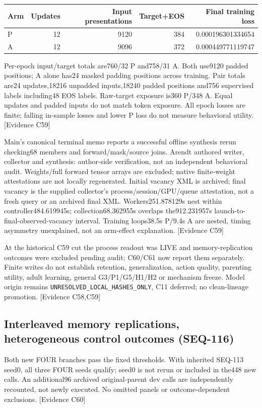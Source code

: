 \documentclass[11pt]{article}
\newcommand{\ev}[1]{\textsf{[Evidence #1]}}
\begin{document}
\begin{center}
\begin{tabular}{lrrrr}
\toprule
Arm & Updates & Input presentations & Target+EOS & Final training loss \\
\midrule
P & 12 & 9120 & 384 & 0.000196301334654 \\
A & 12 & 9096 & 372 & 0.000449771119747 \\
\bottomrule
\end{tabular}
\end{center}

Per-epoch input/target totals are760/32 P and758/31 A. Both use9120 padded
positions; A alone has24 masked padding positions across training. Pair totals
are24 updates,18216 unpadded inputs,18240 padded positions and756 supervised
labels including48 EOS labels. Raw-target exposure is360 P/348 A. Equal updates
and padded inputs do not match token exposure. All epoch losses are finite;
falling in-sample losses and lower P loss do not measure behavioral utility.
\ev{C59}

Main's canonical terminal memo reports a successful offline synthesis rerun
checking68 members and forward/mask/source joins. Arendt authored writer,
collector and synthesis: author-side verification, not an independent behavioral
audit. Weights/full forward tensor arrays are excluded; native finite-weight
attestations are not locally regenerated. Initial vacancy XML is archived;
final vacancy is the supplied collector's process/session/GPU/queue attestation,
not a fresh query or an archived final XML. Workers251.878129s nest within
controller484.619945s; collection68.362955s overlaps the912.231957s
launch-to-final-observed-vacancy interval. Training loops38.5s P/9.4s A are nested,
timing asymmetry unexplained, not an arm-effect explanation. \ev{C59}

At the historical C59 cut the process readout was LIVE and memory-replication
outcomes were excluded pending audit; C60/C61 now report them separately. Finite writes do not establish retention, generalization,
action quality, parenting utility, adult learning, general G3/P1/G5/H1/H2 or
mechanism freeze. Model origin remains \texttt{UNRESOLVED\_LOCAL\_HASHES\_ONLY},
C11 deferred; no clean-lineage promotion. \ev{C58,C59}

\subsection{Interleaved memory replications, heterogeneous control outcomes (SEQ-116)}
Both new FOUR branches pass the fixed thresholds. With inherited SEQ-113 seed0,
all three FOUR seeds qualify; seed0 is not rerun or included in the448 new calls.
An additional96 archived original-parent dev calls are independently recounted,
not newly executed. No omitted panels or outcome-dependent exclusions. \ev{C60}
\end{document}
